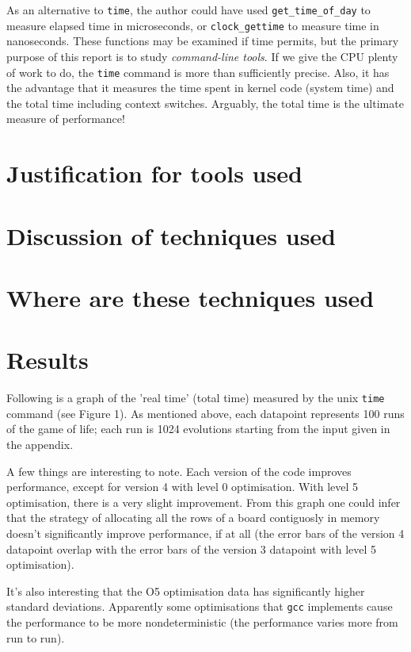 \documentclass{article}
\begin{document}
As an alternative to \verb=time=, the author could have used \verb=get_time_of_day= to measure elapsed time in microseconds, or \verb=clock_gettime= to measure time in nanoseconds. These functions may be examined if time permits, but the primary purpose of this report is to study \emph{command-line tools}. If we give the CPU plenty of work to do, the \verb=time= command is more than sufficiently precise. Also, it has the advantage that it measures the time spent in kernel code (system time) and the total time including context switches. Arguably, the total time is the ultimate measure of performance!  

\section{Justification for tools used}

\section{Discussion of techniques used}

\section{Where are these techniques used}

\section{Results}

Following is a graph of the 'real time' (total time) measured by the unix \verb=time= command (see Figure 1). As mentioned above, each datapoint represents 100 runs of the game of life; each run is 1024 evolutions starting from the input given in the appendix. 

A few things are interesting to note. Each version of the code improves performance, except for version 4 with level 0 optimisation. With level 5 optimisation, there is a very slight improvement. From this graph one could infer that the strategy of allocating all the rows of a board contiguosly in memory doesn't significantly improve performance, if at all (the error bars of the version 4 datapoint overlap with the error bars of the version 3 datapoint with level 5 optimisation). 

It's also interesting that the O5 optimisation data has significantly higher standard deviations. Apparently some optimisations that \verb=gcc= implements cause the performance to be more nondeterministic (the performance varies more from run to run).   
 
\end{document}
